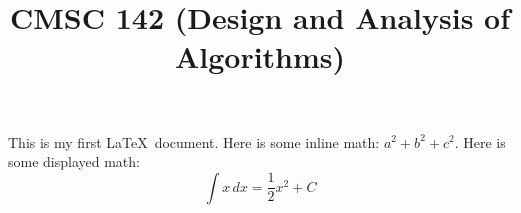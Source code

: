 \documentclass{article}
\begin{document}
  
\title{CMSC 142 (Design and Analysis of Algorithms)}  
\maketitle  This is my first  \LaTeX\ document.  Here is some inline math: $a^2 + b^2 + c^2$.  
Here is some displayed math:  
\[ \int x \, dx = \frac{1}{2} x^2 + C \]  
\end{document}
